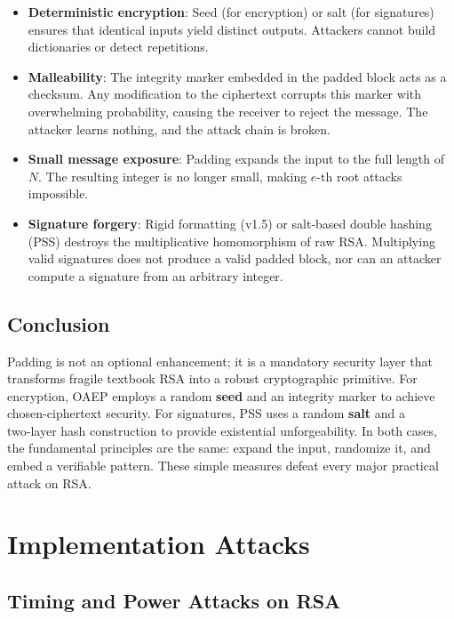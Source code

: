 \begin{itemize}
\item \textbf{Deterministic encryption}: Seed (for encryption) or salt (for signatures) ensures that identical inputs yield distinct outputs. Attackers cannot build dictionaries or detect repetitions.
\item \textbf{Malleability}: The integrity marker embedded in the padded block acts as a checksum. Any modification to the ciphertext corrupts this marker with overwhelming probability, causing the receiver to reject the message. The attacker learns nothing, and the attack chain is broken.
\item \textbf{Small message exposure}: Padding expands the input to the full length of \(N\). The resulting integer is no longer small, making \(e\)-th root attacks impossible.
\item \textbf{Signature forgery}: Rigid formatting (v1.5) or salt‑based double hashing (PSS) destroys the multiplicative homomorphism of raw RSA. Multiplying valid signatures does not produce a valid padded block, nor can an attacker compute a signature from an arbitrary integer.
\end{itemize}

\subsection{Conclusion}

Padding is not an optional enhancement; it is a mandatory security layer that transforms fragile textbook RSA into a robust cryptographic primitive. For encryption, OAEP employs a random \textbf{seed} and an integrity marker to achieve chosen‑ciphertext security. For signatures, PSS uses a random \textbf{salt} and a two‑layer hash construction to provide existential unforgeability. In both cases, the fundamental principles are the same: expand the input, randomize it, and embed a verifiable pattern. These simple measures defeat every major practical attack on RSA.

\section{Implementation Attacks}
\subsection{Timing and Power Attacks on RSA}

